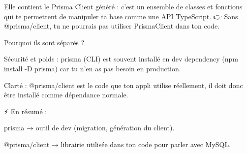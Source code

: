 Elle contient le Prisma Client généré : c’est un ensemble de classes et fonctions qui te permettent de manipuler ta base comme une API TypeScript.
👉 Sans @prisma/client, tu ne pourrais pas utiliser PrismaClient dans ton code.

Pourquoi ils sont séparés ?

Sécurité et poids : prisma (CLI) est souvent installé en dev dependency (npm install -D prisma) car tu n’en as pas besoin en production.

Clarté : @prisma/client est le code que ton appli utilise réellement, il doit donc être installé comme dépendance normale.

⚡ En résumé :

prisma → outil de dev (migration, génération du client).

@prisma/client → librairie utilisée dans ton code pour parler avec MySQL.